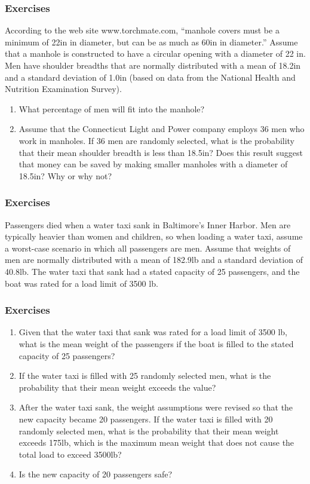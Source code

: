 \documentclass[xcolor=dvipsnames]{beamer}
\begin{document}
\begin{frame}
  \frametitle{Exercises}
  {\ubung} According to the web site www.torchmate.com, ``manhole
  covers must be a minimum of 22in in diameter, but can be as much as
  60in in diameter.'' Assume that a manhole is constructed to have a
  circular opening with a diameter of 22 in. Men have shoulder
  breadths that are normally distributed with a mean of 18.2in and a
  standard deviation of 1.0in (based on data from the National Health
  and Nutrition Examination Survey).
  \begin{enumerate}
  \item What percentage of men will fit into the manhole?
  \item Assume that the Connecticut Light and Power company
    employs 36 men who work in manholes. If 36 men are randomly
    selected, what is the probability that their mean shoulder breadth
    is less than 18.5in? Does this result suggest that money can be
    saved by making smaller manholes with a diameter of 18.5in? Why
    or why not?
  \end{enumerate}
\end{frame}

\begin{frame}
  \frametitle{Exercises}
  {\ubung} Passengers died when a water taxi sank in Baltimore's Inner Harbor.
  Men are typically heavier than women and children, so when loading a
  water taxi, assume a worst-case scenario in which all passengers are
  men. Assume that weights of men are normally distributed with a mean
  of 182.9lb and a standard deviation of 40.8lb. The water taxi that
  sank had a stated capacity of 25 passengers, and the boat was rated
  for a load limit of 3500 lb.
\end{frame}

\begin{frame}
  \frametitle{Exercises}
  \begin{enumerate}
  \item Given that the water taxi that sank was rated for a load
    limit of 3500 lb, what is the mean weight of the passengers if the
    boat is filled to the stated capacity of 25 passengers?
  \item If the water taxi is filled with 25 randomly selected men,
    what is the probability that their mean weight exceeds the value?
  \item After the water taxi sank, the weight assumptions were
    revised so that the new capacity became 20 passengers. If the
    water taxi is filled with 20 randomly selected men, what is the
    probability that their mean weight exceeds 175lb, which is the
    maximum mean weight that does not cause the total load to exceed
    3500lb?
  \item Is the new capacity of 20 passengers safe?
  \end{enumerate}
\end{frame}
\end{document}
